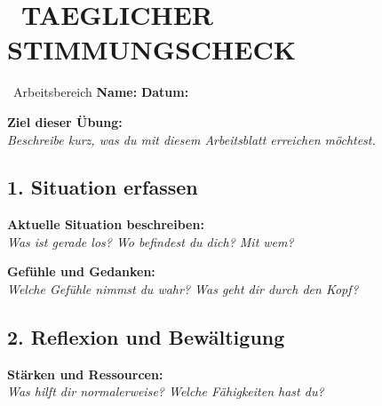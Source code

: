 
\newpage
\section*{\faEdit~TAEGLICHER STIMMUNGSCHECK}
\label{sec:arbeitsblatt-taeglicher-stimmungscheck}

\begin{ctmmBlueBox}{\faEdit~Arbeitsbereich}
\textbf{Name:}  \quad \textbf{Datum:} \\
\vspace{0.5cm}

\textbf{Ziel dieser Übung:}\\
\textit{Beschreibe kurz, was du mit diesem Arbeitsblatt erreichen möchtest.}\\

\vspace{0.8cm}
\end{ctmmBlueBox}

\subsection*{\textcolor{ctmmBlue}{1. Situation erfassen}}

\textbf{Aktuelle Situation beschreiben:}\\
\textit{Was ist gerade los? Wo befindest du dich? Mit wem?}\\

\vspace{0.5cm}
\textbf{Gefühle und Gedanken:}\\
\textit{Welche Gefühle nimmst du wahr? Was geht dir durch den Kopf?}\\

\subsection*{\textcolor{ctmmBlue}{2. Reflexion und Bewältigung}}

\textbf{Stärken und Ressourcen:}\\
\textit{Was hilft dir normalerweise? Welche Fähigkeiten hast du?}\\
 \quad
{} \\
 \quad
{} \\
 

